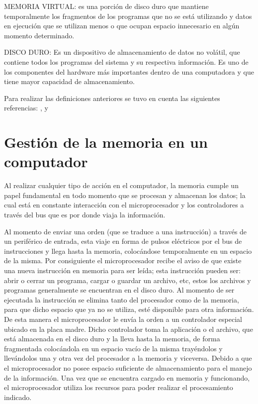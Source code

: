 \documentclass{article}
\begin{document}
\vspace{0.5cm}

MEMORIA VIRTUAL: es una porción de disco duro que mantiene temporalmente los fragmentos de los programas que no se está utilizando y datos en ejecución que se utilizan menos o que ocupan espacio innecesario en algún momento determinado.

\vspace{0.5cm}

DISCO DURO: Es un dispositivo de almacenamiento de datos no volátil, que contiene todos los programas del sistema y su respectiva información. Es uno de los componentes del hardware más importantes dentro de una computadora y que tiene mayor capacidad de almacenamiento.

\vspace{0.5cm}

Para realizar las definiciones anteriores se tuvo en cuenta las siguientes referencias: \cite{ecuredwebsite},\cite{tecdwebsite} y \cite{gestionwebsite}

\section{Gestión de la memoria en un computador} \label{contenido}

Al realizar cualquier tipo de acción en el computador, la memoria cumple un papel fundamental en todo momento que se procesan y almacenan los datos; la cual está en constante interacción con el microprocesador y los controladores a través del bus que es por donde viaja la información.

\vspace{0.5cm}

Al momento de enviar una orden (que se traduce a una instrucción) a través de un periférico de entrada, esta viaje en forma de pulsos eléctricos por el bus de instrucciones y  llega hasta la memoria, colocándose temporalmente en un espacio de la misma. Por consiguiente el microprocesador recibe el aviso de que existe una nueva instrucción en memoria para ser leída; esta instrucción pueden ser: abrir o cerrar un programa, cargar o guardar un archivo, etc, estos los archivos y programas generalmente se encuentran en el disco duro. Al momento de ser ejecutada la instrucción se elimina tanto del procesador como de la memoria, para que dicho espacio que ya no se utiliza, esté disponible para otra información. De esta manera el microprocesador le envía la orden a un controlador especial ubicado en la placa madre. Dicho controlador toma la aplicación o el archivo, que está almacenada en el disco duro y la lleva hasta la memoria, de forma fragmentada colocándola en un espacio vacío de la misma trayéndolos y llevándolos una y otra vez del procesador a la memoria y viceversa. Debido a que el microprocesador no posee espacio suficiente de almacenamiento para el manejo de la información. Una vez que se encuentra cargado en memoria y funcionando, el microprocesador utiliza los  recursos para poder realizar el  procesamiento indicado.
\end{document}

